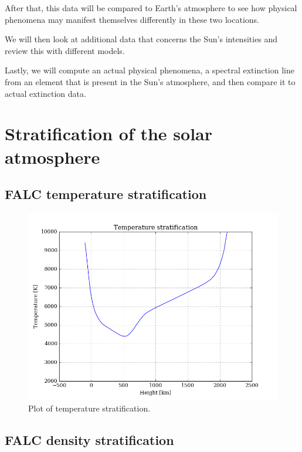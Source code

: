 \documentclass[11pt,a4paper,notitlepage]{article}
\begin{document}
After that, this data will be compared to Earth's atmosphere to see how physical phenomena may manifest themselves differently in these two locations.

We will then look at additional data that concerns the Sun's intensities and review this with different models.

Lastly, we will compute an actual physical phenomena, a spectral extinction line from an element that is present in the Sun's atmosphere, and then compare it to actual extinction data.

\section{Stratification of the solar atmosphere} 						%

\subsection{FALC temperature stratification}
\begin{figure}[H]
\center
\includegraphics[scale=0.42]{../figs/temp_vs_h.png}
\caption{Plot of temperature stratification.}
\end{figure}


\subsection{FALC density stratification}
\end{document}
